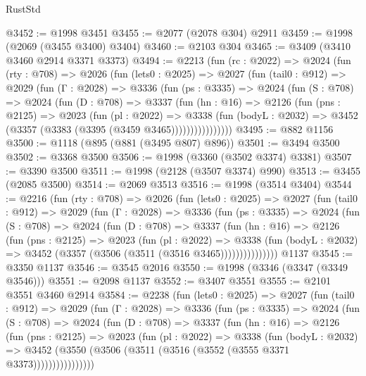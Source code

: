 \begin{lexlean}{RustStd}
\begin{coremodule}
@3452 := @1998 @3451
@3455 := @2077 (@2078 @304) @2911
@3459 := @1998 (@2069 (@3455 @3400) @3404)
@3460 := @2103 @304
@3465 := @3409 (@3410 @3460 @2914 @3371 @3373)
@3494 := @2213
    (fun (rc : @2022) =>
    @2024
      (fun (rty : @708) =>
      @2026
        (fun (lets0 : @2025) =>
        @2027
          (fun (tail0 : @912) =>
          @2029
            (fun (Γ : @2028) =>
            @3336
              (fun (ps : @3335) =>
              @2024
                (fun (S : @708) =>
                @2024
                  (fun (D : @708) =>
                  @3337
                    (fun (hn : @16) =>
                    @2126
                      (fun (pns : @2125) =>
                      @2023
                        (fun (pl : @2022) =>
                        @3338
                          (fun (bodyL : @2032) =>
                          @3452 (@3357 (@3383 (@3395 (@3459 @3465))))))))))))))))
@3495 := @882 @1156
@3500 := @1118 (@895 (@881 (@3495 @807) @896))
@3501 := @3494 @3500
@3502 := @3368 @3500
@3506 := @1998 (@3360 (@3502 @3374) @3381)
@3507 := @3390 @3500
@3511 := @1998 (@2128 (@3507 @3374) @990)
@3513 := @3455 (@2085 @3500)
@3514 := @2069 @3513
@3516 := @1998 (@3514 @3404)
@3544 := @2216
    (fun (rty : @708) =>
    @2026
      (fun (lets0 : @2025) =>
      @2027
        (fun (tail0 : @912) =>
        @2029
          (fun (Γ : @2028) =>
          @3336
            (fun (ps : @3335) =>
            @2024
              (fun (S : @708) =>
              @2024
                (fun (D : @708) =>
                @3337
                  (fun (hn : @16) =>
                  @2126
                    (fun (pns : @2125) =>
                    @2023
                      (fun (pl : @2022) =>
                      @3338
                        (fun (bodyL : @2032) =>
                        @3452 (@3357 (@3506 (@3511 (@3516 @3465)))))))))))))))
    @1137
@3545 := @3350 @1137
@3546 := @3545 @2016
@3550 := @1998 (@3346 (@3347 (@3349 @3546)))
@3551 := @2098 @1137
@3552 := @3407 @3551
@3555 := @2101 @3551 @3460 @2914
@3584 := @2238
    (fun (lets0 : @2025) =>
    @2027
      (fun (tail0 : @912) =>
      @2029
        (fun (Γ : @2028) =>
        @3336
          (fun (ps : @3335) =>
          @2024
            (fun (S : @708) =>
            @2024
              (fun (D : @708) =>
              @3337
                (fun (hn : @16) =>
                @2126
                  (fun (pns : @2125) =>
                  @2023
                    (fun (pl : @2022) =>
                    @3338
                      (fun (bodyL : @2032) =>
                      @3452 (@3550 (@3506 (@3511 (@3516 (@3552 (@3555 @3371 @3373))))))))))))))))

\end{coremodule}
\end{lexlean}
